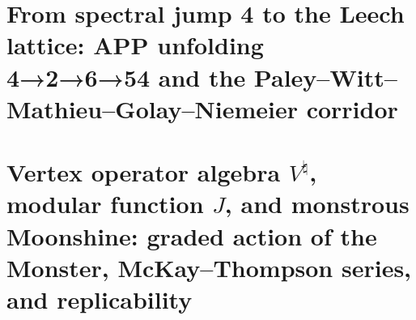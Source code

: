 

\chapter{From spectral jump 4 to the Leech lattice: APP unfolding 4→2→6→54 and the Paley–Witt–Mathieu–Golay–Niemeier corridor}
\label{chap:sucesor-102-21}

\begin{HMTScientificOwnerSubordinated}


\end{HMTScientificOwnerSubordinated}


















\chapter{Vertex operator algebra \texorpdfstring{\(V^\natural\)}{V^♮}, modular function \texorpdfstring{\(J\)}{J}, and monstrous Moonshine: graded action of the Monster, McKay--Thompson series, and replicability}
\label{chap:sucesor-102-22}
\label{chap:voa-moonshine-rector}







